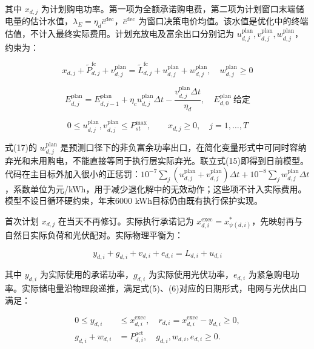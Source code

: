 \documentclass[12pt,a4paper]{ctexart}
\begin{document}
其中 $x_{d,j}$ 为计划购电功率。第一项为全额承诺购电费，第二项为计划窗口末端储电量的估计水值，$\lambda_E=\eta_d\bar c^{\mathrm{dec}}$，$\bar c^{\mathrm{dec}}$ 为窗口决策电价均值。该水值是优化中的终端估值，不计入最终实际费用。计划充放电及富余出口分别记为 $u_{d,j}^{\mathrm{plan}},v_{d,j}^{\mathrm{plan}},w_{d,j}^{\mathrm{plan}}$，约束为：

\begin{equation}
x_{d,j}+\widetilde P_{d,j}^{\mathrm{fc}}+v_{d,j}^{\mathrm{plan}}=\widetilde L_{d,j}^{\mathrm{fc}}+u_{d,j}^{\mathrm{plan}}+w_{d,j}^{\mathrm{plan}},\quad w_{d,j}^{\mathrm{plan}}\ge0
\end{equation}

\begin{equation}
E_{d,j}^{\mathrm{plan}}=E_{d,j-1}^{\mathrm{plan}}+\eta_c u_{d,j}^{\mathrm{plan}}\Delta t-\frac{v_{d,j}^{\mathrm{plan}}\Delta t}{\eta_d},\quad E_{d,0}^{\mathrm{plan}}\ \text{给定}
\end{equation}

\begin{equation}
0\le u_{d,j}^{\mathrm{plan}},v_{d,j}^{\mathrm{plan}}\le P_{st}^{\max},\qquad x_{d,j}\ge0,\quad j=1,\ldots,T
\end{equation}

式(17)的 $w_{d,j}^{\mathrm{plan}}$ 是预测口径下的非负富余功率出口，在简化变量形式中可同时容纳弃光和未用购电，不能直接等同于执行层实际弃光。联立式(15)即得到日前模型。代码在主目标外加入很小的正惩罚：$10^{-7}\sum_j(u_{d,j}^{\mathrm{plan}}+v_{d,j}^{\mathrm{plan}})\Delta t+10^{-8}\sum_j w_{d,j}^{\mathrm{plan}}\Delta t$，系数单位为元/kWh，用于减少退化解中的无效动作；这些项不计入实际费用。模型不设日循环硬约束，年末6000 kWh目标仍由既有执行保护实现。

首次计划 $x_{d,j}$ 在当天不再修订。实际执行承诺记为 $x_{d,i}^{\mathrm{exec}}=x_{\psi(d,i)}^*$，先映射再与自然日实际负荷和光伏配对。实际物理平衡为：

\begin{equation}
y_{d,i}+g_{d,i}+v_{d,i}+e_{d,i}=L_{d,i}+u_{d,i}
\end{equation}

其中 $y_{d,i}$ 为实际使用的承诺功率，$g_{d,i}$ 为实际使用光伏功率，$e_{d,i}$ 为紧急购电功率。实际储电量沿物理段递推，满足式(5)、(6)对应的日期形式，电网与光伏出口满足：

\begin{equation}
\begin{aligned}0\le y_{d,i}&\le x_{d,i}^{\mathrm{exec}},\quad r_{d,i}=x_{d,i}^{\mathrm{exec}}-y_{d,i}\ge0,\\g_{d,i}+w_{d,i}&=P_{d,i}^{\mathrm{act}},\quad g_{d,i},w_{d,i},e_{d,i}\ge0.\end{aligned}
\end{equation}
\end{document}
